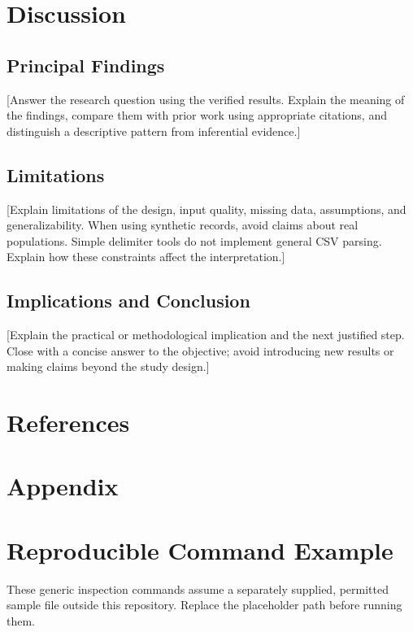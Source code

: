 \documentclass[12pt,letterpaper]{article}
\begin{document}
\section{Discussion}
\subsection{Principal Findings}
[Answer the research question using the verified results. Explain the meaning
of the findings, compare them with prior work using appropriate citations,
and distinguish a descriptive pattern from inferential evidence.]

\subsection{Limitations}
[Explain limitations of the design, input quality, missing data, assumptions,
and generalizability. When using synthetic records, avoid claims about real populations. Simple
delimiter tools do not implement general CSV parsing. Explain how these constraints affect the interpretation.]

\subsection{Implications and Conclusion}
[Explain the practical or methodological implication and the next justified
step. Close with a concise answer to the objective; avoid introducing new
results or making claims beyond the study design.]

\newpage
\section*{References}
\printbibliography[heading=none]

\newpage
\section*{Appendix}
\section*{Reproducible Command Example}
These generic inspection commands assume a separately supplied, permitted
sample file outside this repository. Replace the placeholder path before running them.
\end{document}
